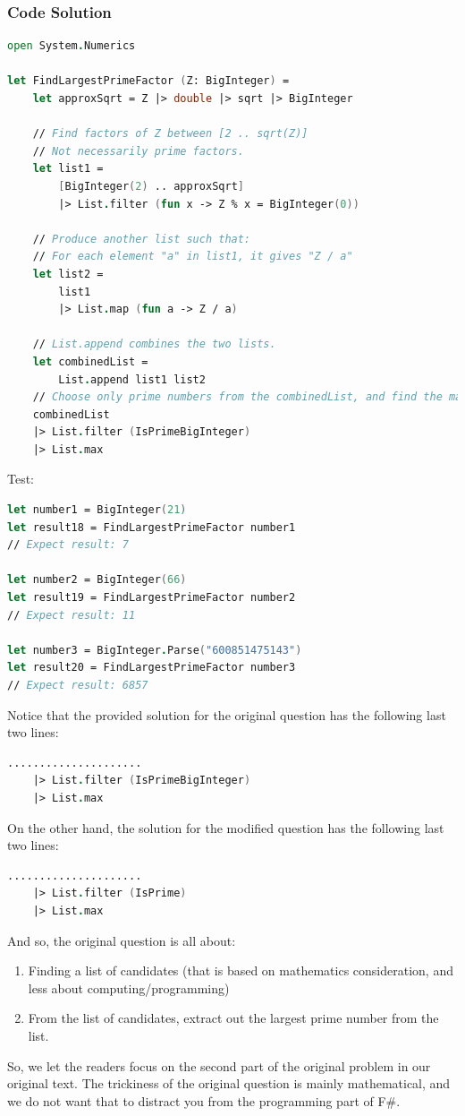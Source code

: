 \documentclass[12pt]{article}
\begin{document}
\subsubsection*{Code Solution}
\begin{lstlisting}[language=FSharp]
open System.Numerics

let FindLargestPrimeFactor (Z: BigInteger) =
    let approxSqrt = Z |> double |> sqrt |> BigInteger

    // Find factors of Z between [2 .. sqrt(Z)]
    // Not necessarily prime factors.
    let list1 =
        [BigInteger(2) .. approxSqrt]
        |> List.filter (fun x -> Z % x = BigInteger(0))

    // Produce another list such that:
    // For each element "a" in list1, it gives "Z / a"
    let list2 =
        list1
        |> List.map (fun a -> Z / a)

    // List.append combines the two lists.
    let combinedList =
        List.append list1 list2
    // Choose only prime numbers from the combinedList, and find the maximum using List.max
    combinedList
    |> List.filter (IsPrimeBigInteger)
    |> List.max
\end{lstlisting}
Test:
\begin{lstlisting}[language=FSharp]
let number1 = BigInteger(21)
let result18 = FindLargestPrimeFactor number1  
// Expect result: 7

let number2 = BigInteger(66)
let result19 = FindLargestPrimeFactor number2
// Expect result: 11

let number3 = BigInteger.Parse("600851475143")
let result20 = FindLargestPrimeFactor number3
// Expect result: 6857
\end{lstlisting}
Notice that the provided solution for the original question has the following last two lines:
\begin{lstlisting}[language=FSharp]
    .....................
    |> List.filter (IsPrimeBigInteger)
    |> List.max
\end{lstlisting}
On the other hand, the solution for the modified question has the following last two lines:
\begin{lstlisting}[language=FSharp]
    .....................
    |> List.filter (IsPrime)
    |> List.max
\end{lstlisting}
And so, the original question is all about:
\begin{enumerate}
\item Finding a list of candidates (that is based on mathematics consideration, and less about computing/programming)
\item From the list of candidates, extract out the largest prime number from the list.
\end{enumerate}
So, we let the readers focus on the second part of the original problem in our original text. The trickiness of the original question is mainly mathematical, and we do not want that to distract you from the programming part of F\#.
\pagebreak
\end{document}
